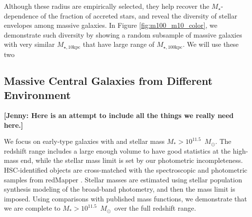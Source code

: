 \documentclass[a4paper,fleqn,usenatbib]{mnras}
\def\msun{$M_\odot$}
\def\redm{\texttt{redMaPPer}}
\def\rbcg{\texttt{cenHighMh}}
\def\nbcg{\texttt{cenLowMh}}
\def\mstar{{$M_{\star}$}}
\def\minn{{$M_{\star,10\mathrm{kpc}}$}}
\def\mtot{{$M_{\star,100\mathrm{kpc}}$}}
\newcommand{\alexie}[1]{\textcolor{blue}{\textbf{[Alexie: #1]}}}
\newcommand{\jenny}[1]{\textcolor{Bittersweet}{\textbf{[Jenny: #1]}}}
\begin{document}
   Although these radius are empirically selected, they help recover the 
   \mstar{}-dependence of the fraction of accreted stars, and reveal the diversity of 
   stellar envelopes among massive galaxies. 
   In Figure \ref{fig:m100_m10_color}, we demonstrate such diversity by showing 
   a random subsample of massive galaxies with very similar \minn{} that have large 
   range of \mtot{}. 
   We will use these two 
   
   
   
\subsection{Massive Central Galaxies from Different Environment}
    \label{ssec:cen}

    
    \jenny{Here is an attempt to include all the things we really need here.}
     
    We focus on early-type galaxies with  and stellar mass $M_*>10^{11.5}$~\msun. 
    The redshift range includes a large enough volume to have good statistics at the high-mass end, while 
    the stellar mass limit is set by our photometric incompleteness. HSC-identified objects are cross-matched 
    with the spectroscopic and photometric samples from redMapper \citep{Rykoff2014}. Stellar masses are estimated 
    using stellar population synthesis modeling of the broad-band photometry, and then the mass limit is 
    imposed. Using comparisons with published mass functions, we demonstrate that we are complete 
    to $M_*>10^{11.5}$~\msun\ over the full redshift range. 
    
\end{document}
